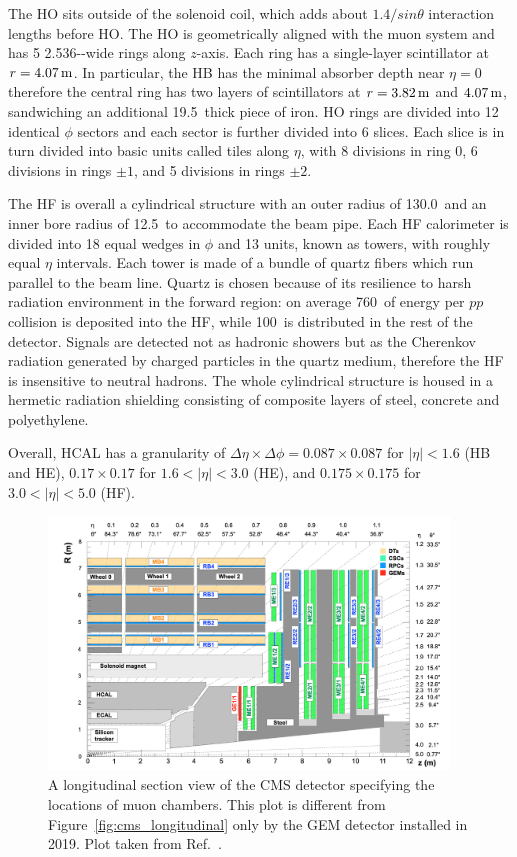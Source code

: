 The HO sits outside of the solenoid coil, which adds about $1.4 / sin\theta$ interaction lengths before HO.
The HO is geometrically aligned with the muon system and has 5 2.536-\meter-wide rings along $z$-axis.
Each ring has a single-layer scintillator at $r = 4.07 \meter$.
In particular, the HB has the minimal absorber depth near $\eta = 0$ therefore the central ring has 
two layers of scintillators at $r = 3.82 \meter$ and $4.07 \meter$, sandwiching an additional 19.5~\cm thick piece of iron.
HO rings are divided into 12 identical $\phi$ sectors and each sector is further divided into 6 slices.
Each slice is in turn divided into basic units called tiles along $\eta$, with 8 divisions in ring 0, 6 divisions in rings $\pm 1$, and 5 divisions in rings $\pm 2$. 

The HF is overall a cylindrical structure with an outer radius of 130.0~\cm and an inner bore radius of 12.5~\cm to accommodate the beam pipe.
Each HF calorimeter is divided into 18 equal wedges in $\phi$ and 13 units, known as towers, with roughly equal $\eta$ intervals. 
Each tower is made of a bundle of quartz fibers which run parallel to the beam line.
Quartz is chosen because of its resilience to harsh radiation environment in the forward region:
on average 760~\GeV of energy per $pp$ collision is deposited into the HF, while 100~\GeV is distributed in the rest of the detector.
Signals are detected not as hadronic showers but as the Cherenkov radiation generated by charged particles in the quartz medium, 
therefore the HF is insensitive to neutral hadrons.
The whole cylindrical structure is housed in a hermetic radiation shielding consisting of composite layers of steel, concrete and polyethylene. 

Overall, HCAL has a granularity of $\Delta\eta \times \Delta\phi = 0.087 \times 0.087$ for $|\eta| < 1.6$ (HB and HE), 
$0.17 \times 0.17$ for $1.6 < |\eta| < 3.0$ (HE), and $0.175 \times 0.175$ for $3.0 < |\eta| < 5.0$ (HF).


\begin{figure}[!htb]
    \centering
    \captionsetup{justification=justified}
    \includegraphics[width=0.95\textwidth]{pics/LHC_CMS/muon_chambers.png}
    \caption{A longitudinal section view of the CMS detector specifying the locations of muon chambers.
             This plot is different from Figure~\ref{fig:cms_longitudinal} only by the GEM detector installed in 2019.
             Plot taken from Ref.~\cite{Colaleo:2021453}.}
    \label{fig:cms_muons}
\end{figure}

